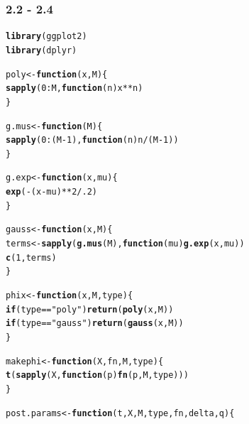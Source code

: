 \documentclass[a4paper,12pt]{article}\usepackage[]{graphicx}\usepackage[]{color}
\makeatletter
\newcommand{\hlnum}[1]{\textcolor[rgb]{0.686,0.059,0.569}{#1}}%
\newcommand{\hlstr}[1]{\textcolor[rgb]{0.192,0.494,0.8}{#1}}%
\newcommand{\hlopt}[1]{\textcolor[rgb]{0,0,0}{#1}}%
\newcommand{\hlstd}[1]{\textcolor[rgb]{0.345,0.345,0.345}{#1}}%
\newcommand{\hlkwa}[1]{\textcolor[rgb]{0.161,0.373,0.58}{\textbf{#1}}}%
\newcommand{\hlkwb}[1]{\textcolor[rgb]{0.69,0.353,0.396}{#1}}%
\newcommand{\hlkwc}[1]{\textcolor[rgb]{0.333,0.667,0.333}{#1}}%
\newcommand{\hlkwd}[1]{\textcolor[rgb]{0.737,0.353,0.396}{\textbf{#1}}}%
\newenvironment{kframe}{%
 \def\at@end@of@kframe{}%
 \ifinner\ifhmode%
  \def\at@end@of@kframe{\end{minipage}}%
  \begin{minipage}{\columnwidth}%
 \fi\fi%
 \def\FrameCommand##1{\hskip\@totalleftmargin \hskip-\fboxsep
 \colorbox{shadecolor}{##1}\hskip-\fboxsep
     \hskip-\linewidth \hskip-\@totalleftmargin \hskip\columnwidth}%
 \MakeFramed {\advance\hsize-\width
   \@totalleftmargin\z@ \linewidth\hsize
   \@setminipage}}%
 {\par\unskip\endMakeFramed%
 \at@end@of@kframe}
\newenvironment{knitrout}{}{} %
\makeatother
\begin{document}
\subsubsection{2.2 - 2.4}
\begin{knitrout}\scriptsize
{}\color{fgcolor}\begin{kframe}
\begin{alltt}
\hlkwd{library}\hlstd{(ggplot2)}
\hlkwd{library}\hlstd{(dplyr)}

\hlstd{poly} \hlkwb{<-} \hlkwa{function} \hlstd{(}\hlkwc{x}\hlstd{,} \hlkwc{M}\hlstd{) \{}
    \hlkwd{sapply}\hlstd{(}\hlnum{0}\hlopt{:}\hlstd{M,} \hlkwa{function} \hlstd{(}\hlkwc{n}\hlstd{) x}\hlopt{**}\hlstd{n)}
\hlstd{\}}

\hlstd{g.mus} \hlkwb{<-} \hlkwa{function} \hlstd{(}\hlkwc{M}\hlstd{) \{}
    \hlkwd{sapply}\hlstd{(}\hlnum{0}\hlopt{:}\hlstd{(M}\hlopt{-}\hlnum{1}\hlstd{),} \hlkwa{function} \hlstd{(}\hlkwc{n}\hlstd{) n}\hlopt{/}\hlstd{(M}\hlopt{-}\hlnum{1}\hlstd{))}
\hlstd{\}}

\hlstd{g.exp} \hlkwb{<-} \hlkwa{function} \hlstd{(}\hlkwc{x}\hlstd{,} \hlkwc{mu}\hlstd{) \{}
    \hlkwd{exp}\hlstd{(}\hlopt{-}\hlstd{(x}\hlopt{-}\hlstd{mu)}\hlopt{**}\hlnum{2}\hlopt{/}\hlnum{.2}\hlstd{)}
\hlstd{\}}

\hlstd{gauss} \hlkwb{<-} \hlkwa{function} \hlstd{(}\hlkwc{x}\hlstd{,} \hlkwc{M}\hlstd{) \{}
    \hlstd{terms} \hlkwb{<-} \hlkwd{sapply}\hlstd{(}\hlkwd{g.mus}\hlstd{(M),} \hlkwa{function} \hlstd{(}\hlkwc{mu}\hlstd{)} \hlkwd{g.exp}\hlstd{(x, mu))}
    \hlkwd{c}\hlstd{(}\hlnum{1}\hlstd{, terms)}
\hlstd{\}}

\hlstd{phix} \hlkwb{<-} \hlkwa{function} \hlstd{(}\hlkwc{x}\hlstd{,} \hlkwc{M}\hlstd{,} \hlkwc{type}\hlstd{) \{}
    \hlkwa{if} \hlstd{(type} \hlopt{==} \hlstr{"poly"}\hlstd{)} \hlkwd{return}\hlstd{(}\hlkwd{poly}\hlstd{(x, M))}
    \hlkwa{if} \hlstd{(type} \hlopt{==} \hlstr{"gauss"}\hlstd{)} \hlkwd{return}\hlstd{(}\hlkwd{gauss}\hlstd{(x, M))}
\hlstd{\}}

\hlstd{makephi} \hlkwb{<-} \hlkwa{function} \hlstd{(}\hlkwc{X}\hlstd{,} \hlkwc{fn}\hlstd{,} \hlkwc{M}\hlstd{,} \hlkwc{type}\hlstd{) \{}
    \hlkwd{t}\hlstd{(}\hlkwd{sapply}\hlstd{(X,} \hlkwa{function} \hlstd{(}\hlkwc{p}\hlstd{)} \hlkwd{fn}\hlstd{(p, M, type)))}
\hlstd{\}}

\hlstd{post.params} \hlkwb{<-} \hlkwa{function} \hlstd{(}\hlkwc{t}\hlstd{,} \hlkwc{X}\hlstd{,} \hlkwc{M}\hlstd{,} \hlkwc{type}\hlstd{,} \hlkwc{fn}\hlstd{,} \hlkwc{delta}\hlstd{,} \hlkwc{q}\hlstd{) \{}


\end{alltt}
\end{kframe}
\end{knitrout}
\end{document}

